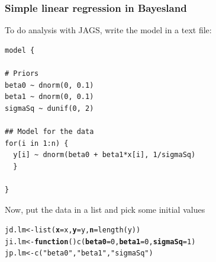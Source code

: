 \documentclass[color=usenames,dvipsnames]{beamer}\usepackage[]{graphicx}\usepackage[]{color}
\makeatletter
\newcommand{\hlnum}[1]{\textcolor[rgb]{0.69,0.494,0}{#1}}%
\newcommand{\hlstr}[1]{\textcolor[rgb]{0.749,0.012,0.012}{#1}}%
\newcommand{\hlstd}[1]{\textcolor[rgb]{0,0,0}{#1}}%
\newcommand{\hlkwa}[1]{\textcolor[rgb]{0,0,0}{\textbf{#1}}}%
\newcommand{\hlkwb}[1]{\textcolor[rgb]{0,0.341,0.682}{#1}}%
\newcommand{\hlkwc}[1]{\textcolor[rgb]{0,0,0}{\textbf{#1}}}%
\newcommand{\hlkwd}[1]{\textcolor[rgb]{0.004,0.004,0.506}{#1}}%
\newenvironment{kframe}{%
 \def\at@end@of@kframe{}%
 \ifinner\ifhmode%
  \def\at@end@of@kframe{\end{minipage}}%
  \begin{minipage}{\columnwidth}%
 \fi\fi%
 \def\FrameCommand##1{\hskip\@totalleftmargin \hskip-\fboxsep
 \colorbox{shadecolor}{##1}\hskip-\fboxsep
     \hskip-\linewidth \hskip-\@totalleftmargin \hskip\columnwidth}%
 \MakeFramed {\advance\hsize-\width
   \@totalleftmargin\z@ \linewidth\hsize
   \@setminipage}}%
 {\par\unskip\endMakeFramed%
 \at@end@of@kframe}
\newenvironment{knitrout}{}{} %
\makeatother
\begin{document}
\begin{frame}[fragile]
  \frametitle{Simple linear regression in Bayesland}
  \small
  To do analysis with JAGS, write the model in a text file:
\begin{knitrout}\scriptsize
{}\color{fgcolor}\begin{kframe}
\begin{verbatim}
model {

# Priors
beta0 ~ dnorm(0, 0.1) 
beta1 ~ dnorm(0, 0.1)
sigmaSq ~ dunif(0, 2)

## Model for the data
for(i in 1:n) {
  y[i] ~ dnorm(beta0 + beta1*x[i], 1/sigmaSq)
  }

}
\end{verbatim}
\end{kframe}
\end{knitrout}
\pause
\vfill
Now, put the data in a list and pick some initial values
\begin{knitrout}
\color{fgcolor}\begin{kframe}
\begin{alltt}
\hlstd{jd.lm} \hlkwb{<-} \hlkwd{list}\hlstd{(}\hlkwc{x}\hlstd{=x,} \hlkwc{y}\hlstd{=y,} \hlkwc{n}\hlstd{=}\hlkwd{length}\hlstd{(y))}
\hlstd{ji.lm} \hlkwb{<-} \hlkwa{function}\hlstd{()} \hlkwd{c}\hlstd{(}\hlkwc{beta0}\hlstd{=}\hlnum{0}\hlstd{,} \hlkwc{beta1}\hlstd{=}\hlnum{0}\hlstd{,} \hlkwc{sigmaSq}\hlstd{=}\hlnum{1}\hlstd{)}
\hlstd{jp.lm} \hlkwb{<-} \hlkwd{c}\hlstd{(}\hlstr{"beta0"}\hlstd{,} \hlstr{"beta1"}\hlstd{,} \hlstr{"sigmaSq"}\hlstd{)}
\end{alltt}
\end{kframe}
\end{knitrout}
\end{frame}
\end{document}
